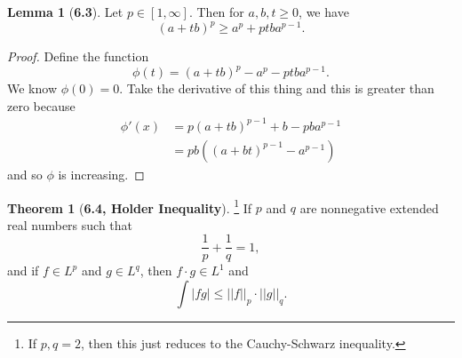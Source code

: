 \documentclass[12pt]{article}
\theoremstyle{definition}
\newtheorem*{thm}{Theorem}
\newtheorem*{lemma}{Lemma}
\begin{document}
\begin{lemma}[\textbf{6.3}]

    Let \( p \in [1, \infty] \). Then for \(a, b, t \geq 0 \), we have 
        \[
            (a + tb)^{p} \geq a^{p} + ptba^{p-1}.  
        \]
        \begin{proof}
            Define the function 
                \[
                    \phi(t) = (a + tb)^{p} - a^{p} - ptba^{p-1}.
                \]
            We know \( \phi(0) = 0 \). Take the derivative of this thing and this is greater than zero because
                \begin{align*}
                    \phi'(x) &= p(a + tb)^{p-1} + b - pba^{p-1} \\
                    &= pb \left( (a + bt)^{p-1} - a^{p-1} \right)
                \end{align*}
            and so \( \phi \) is increasing. 
        \end{proof}
    
\end{lemma}

\begin{thm}[\textbf{6.4, Holder Inequality}]\footnote{If \( p,q  = 2 \), then this just reduces to the Cauchy-Schwarz inequality.} If \( p \) and \( q \) are nonnegative extended real numbers such that 
        \[
            \frac{1}{p} + \frac{1}{q} = 1,  
        \]
    and if \( f \in L^p \) and \( g \in L^q \), then \( f \cdot g \in L^1 \) and 
        \[
            \int | f g | \leq ||f||_{p} \cdot ||g||_{q}. 
        \]

\end{thm}
\end{document}
